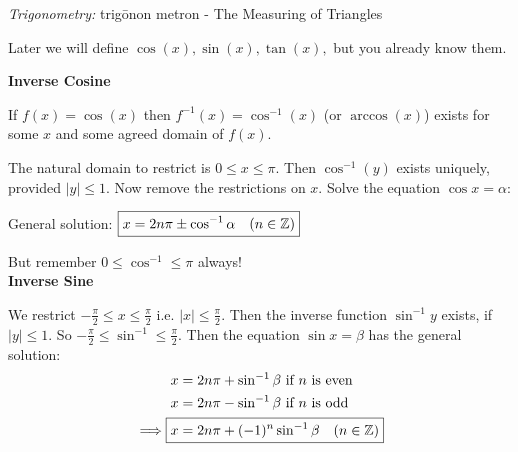 \documentclass[twoside]{scrartcl}
\begin{document}

\emph{Trigonometry:} 
trigōnon metron 
 - The Measuring of Triangles

Later we will define $\cos(x), \sin(x), \tan(x),$ but you already know them. 

\textbf{Inverse Cosine}

If $f(x) = \cos(x)$ then $f^{-1}(x) = \cos^{-1}(x)$ (or $\arccos(x)$) exists for some $x$ and some agreed domain of $f(x)$. 
  \begin{center}
\end{center}

The natural domain to restrict is $0 \leq x \leq \pi$. Then $\cos^{-1}(y)$ exists uniquely, provided $|y| \leq 1$. Now remove the restrictions on $x$. Solve the equation $\cos x = \alpha$:

General solution: $\boxed{ x = 2n\pi \pm \cos^{-1}\alpha \quad (n \in \mathbb{Z})}$

But remember $0 \leq \cos^{-1} \leq \pi $ always!\\

\textbf{Inverse Sine}

  \begin{center}
\end{center}

We restrict $-\frac{\pi}{2} \leq x \leq \frac{\pi}{2}$ i.e. $|x| \leq \frac{\pi}{2}$. Then the inverse function $\sin^{-1}y$ exists, if $|y| \leq 1$. So $-\frac{\pi}{2} \leq \sin^{-1} \leq \frac{\pi}{2}$. Then the equation $\sin x = \beta$ has the general solution:
\[\begin{aligned}
x &= 2n\pi + \sin^{-1}\beta \mbox{ if $n$ is even}\\
x &= 2n\pi - \sin^{-1}\beta \mbox{ if $n$ is odd}\\
\implies \Aboxed{ x &= 2n\pi + (-1)^n \sin^{-1}\beta \quad (n \in \Z)}
\end{aligned}\]~
\end{document}
